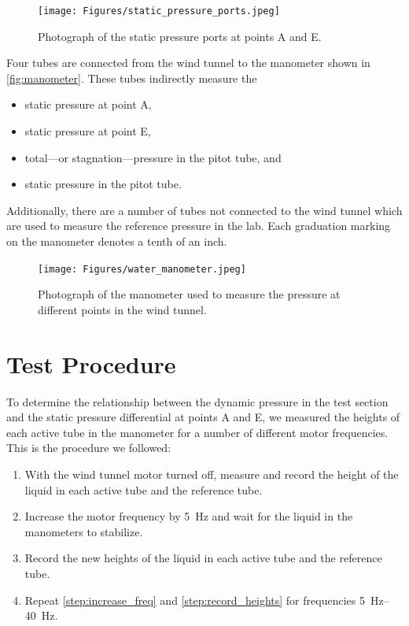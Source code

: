\begin{figure}[htpb]
    \centering
    \texttt{[image: Figures/static\_pressure\_ports.jpeg]}
    \caption[Photograph of static pressure ports]{Photograph of the static pressure ports at points A and E.}
    \label{fig:static_pressure_ports}
\end{figure}

Four tubes are connected from the wind tunnel to the manometer shown in \autoref{fig:manometer}. These tubes indirectly measure the

\begin{itemize}
    \item static pressure at point A,
    \item static pressure at point E,
    \item total—or stagnation—pressure in the pitot tube, and
    \item static pressure in the pitot tube.
\end{itemize}

\noindent{}Additionally, there are a number of tubes not connected to the wind tunnel which are used to measure the reference pressure in the lab. Each graduation marking on the manometer denotes a tenth of an inch.

\begin{figure}[htpb]
    \centering
    \texttt{[image: Figures/water\_manometer.jpeg]}
    \caption[Photograph of the manometer]{Photograph of the manometer used to measure the pressure at different points in the wind tunnel.}
    \label{fig:manometer}
\end{figure}

\section{Test Procedure}
To determine the relationship between the dynamic pressure in the test section and the static pressure differential at points A and E, we measured the heights of each active tube in the manometer for a number of different motor frequencies. This is the procedure we followed:

\begin{enumerate}
    \item With the wind tunnel motor turned off, measure and record the height of the liquid in each active tube and the reference tube.
    \item Increase the motor frequency by \qty{5}{\hertz} and wait for the liquid in the manometers to stabilize. \label{step:increase_freq}
    \item Record the new heights of the liquid in each active tube and the reference tube. \label{step:record_heights}
    \item Repeat \autoref{step:increase_freq} and \autoref{step:record_heights} for frequencies \qtyrange{5}{40}{\hertz}.
\end{enumerate}

